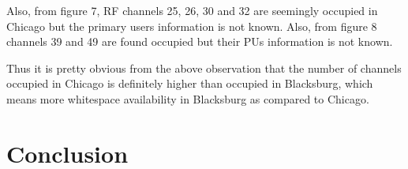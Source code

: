 \documentclass[12pt,sts]{report}
\begin{document}
	Also, from figure 7, RF channels 25, 26, 30 and 32 are seemingly occupied in Chicago but the primary users information is not known. Also, from figure 8 channels 39 and 49 are found occupied but their PUs information is not known.
	
	Thus it is pretty obvious from the above observation that the number of channels occupied in Chicago is definitely higher than occupied in Blacksburg, which means more whitespace availability in Blacksburg as compared to Chicago.
\pagebreak
	
	
	
	

\section{Conclusion}
\end{document}
